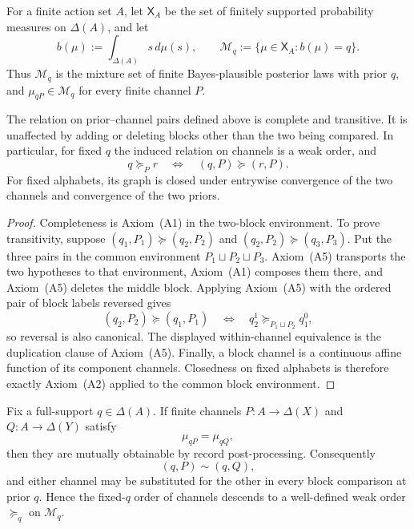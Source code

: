 For a finite action set $A$, let $\mathsf X_A$ be the set of finitely
supported probability measures on $\Delta(A)$, and let
\[
 b(\mu):=\int_{\Delta(A)}s\,d\mu(s),
 \qquad
 \mathcal M_q:=\{\mu\in\mathsf X_A:b(\mu)=q\}.
\]
Thus $\mathcal M_q$ is the mixture set of finite Bayes-plausible posterior
laws with prior $q$, and $\mu_{qP}\in\mathcal M_q$ for every finite channel
$P$.

\begin{lemma}\label{pt:lem:blockcoh}
The relation on prior--channel pairs defined above is complete and transitive.
It is unaffected by adding or deleting blocks other than the two being
compared.  In particular, for fixed $q$ the induced relation on channels is a
weak order, and
\[
 q\succeq_P r
 \quad\Longleftrightarrow\quad
 (q,P)\succeq(r,P).
\]
For fixed alphabets, its graph is closed under entrywise convergence of the
two channels and convergence of the two priors.
\end{lemma}

\begin{proof}
Completeness is Axiom~\textup{(A1)} in the two-block environment.  To prove
transitivity, suppose
$(q_1,P_1)\succeq(q_2,P_2)$ and
$(q_2,P_2)\succeq(q_3,P_3)$.  Put the three pairs in the common environment
$P_1\sqcup P_2\sqcup P_3$.  Axiom~\textup{(A5)} transports the two
hypotheses to that environment, Axiom~\textup{(A1)} composes them there, and
Axiom~\textup{(A5)} deletes the middle block.  Applying Axiom~\textup{(A5)}
with the ordered pair of block labels reversed gives
\[
 (q_2,P_2)\succeq(q_1,P_1)
 \quad\Longleftrightarrow\quad
 q_2^1\succeq_{P_1\sqcup P_2}q_1^0,
\]
so reversal is also canonical.  The displayed within-channel equivalence is
the duplication clause of Axiom~\textup{(A5)}.  Finally, a block channel is a
continuous affine function of its component channels.  Closedness on fixed
alphabets is therefore exactly Axiom~\textup{(A2)} applied to the common block
environment.
\end{proof}

\begin{lemma}\label{pt:lem:blackwell}\label{pt:lem:plsuff}
Fix a full-support $q\in\Delta(A)$.  If finite channels
$P:A\to\Delta(X)$ and $Q:A\to\Delta(Y)$ satisfy
\[
 \mu_{qP}=\mu_{qQ},
\]
then they are mutually obtainable by record post-processing.  Consequently
\[
 (q,P)\sim(q,Q),
\]
and either channel may be substituted for the other in every block
comparison at prior $q$.  Hence the fixed-$q$ order of channels descends to a
well-defined weak order $\succeq_q$ on $\mathcal M_q$.
\end{lemma}

